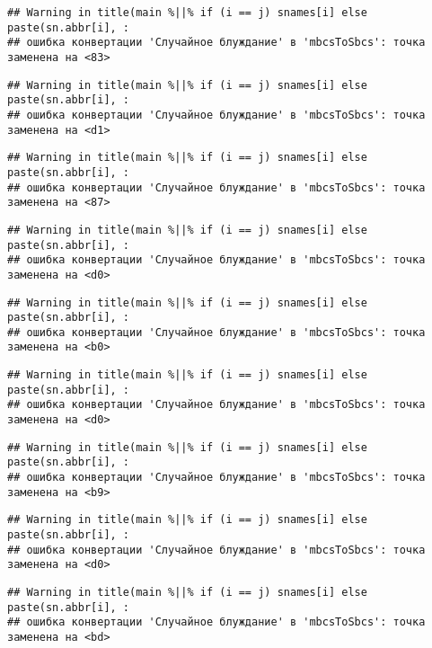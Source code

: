 \documentclass[
]{article}
\begin{document}
\begin{verbatim}
## Warning in title(main %||% if (i == j) snames[i] else paste(sn.abbr[i], :
## ошибка конвертации 'Случайное блуждание' в 'mbcsToSbcs': точка заменена на <83>
\end{verbatim}

\begin{verbatim}
## Warning in title(main %||% if (i == j) snames[i] else paste(sn.abbr[i], :
## ошибка конвертации 'Случайное блуждание' в 'mbcsToSbcs': точка заменена на <d1>
\end{verbatim}

\begin{verbatim}
## Warning in title(main %||% if (i == j) snames[i] else paste(sn.abbr[i], :
## ошибка конвертации 'Случайное блуждание' в 'mbcsToSbcs': точка заменена на <87>
\end{verbatim}

\begin{verbatim}
## Warning in title(main %||% if (i == j) snames[i] else paste(sn.abbr[i], :
## ошибка конвертации 'Случайное блуждание' в 'mbcsToSbcs': точка заменена на <d0>
\end{verbatim}

\begin{verbatim}
## Warning in title(main %||% if (i == j) snames[i] else paste(sn.abbr[i], :
## ошибка конвертации 'Случайное блуждание' в 'mbcsToSbcs': точка заменена на <b0>
\end{verbatim}

\begin{verbatim}
## Warning in title(main %||% if (i == j) snames[i] else paste(sn.abbr[i], :
## ошибка конвертации 'Случайное блуждание' в 'mbcsToSbcs': точка заменена на <d0>
\end{verbatim}

\begin{verbatim}
## Warning in title(main %||% if (i == j) snames[i] else paste(sn.abbr[i], :
## ошибка конвертации 'Случайное блуждание' в 'mbcsToSbcs': точка заменена на <b9>
\end{verbatim}

\begin{verbatim}
## Warning in title(main %||% if (i == j) snames[i] else paste(sn.abbr[i], :
## ошибка конвертации 'Случайное блуждание' в 'mbcsToSbcs': точка заменена на <d0>
\end{verbatim}

\begin{verbatim}
## Warning in title(main %||% if (i == j) snames[i] else paste(sn.abbr[i], :
## ошибка конвертации 'Случайное блуждание' в 'mbcsToSbcs': точка заменена на <bd>
\end{verbatim}
\end{document}

